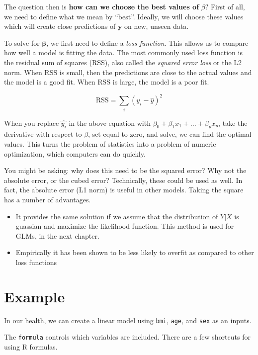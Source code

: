 \documentclass[openany]{book}
\providecommand{\tightlist}{%
  \setlength{\itemsep}{0pt}\setlength{\parskip}{0pt}}
\begin{document}
The question then is \textbf{how can we choose the best values of} \(\beta?\) First of all, we need to define what we mean by ``best''. Ideally, we will choose these values which will create close predictions of \(\mathbf{y}\) on new, unseen data.

To solve for \(\mathbf{\beta}\), we first need to define a \emph{loss function}. This allows us to compare how well a model is fitting the data. The most commonly used loss function is the residual sum of squares (RSS), also called the \emph{squared error loss} or the L2 norm. When RSS is small, then the predictions are close to the actual values and the model is a good fit. When RSS is large, the model is a poor fit.

\[
\text{RSS} = \sum_i(y_i - \hat{y})^2
\]

When you replace \(\hat{y_i}\) in the above equation with \(\beta_0 + \beta_1 x_1 + ... + \beta_p x_p\), take the derivative with respect to \(\beta\), set equal to zero, and solve, we can find the optimal values. This turns the problem of statistics into a problem of numeric optimization, which computers can do quickly.

You might be asking: why does this need to be the squared error? Why not the absolute error, or the cubed error? Technically, these could be used as well. In fact, the absolute error (L1 norm) is useful in other models. Taking the square has a number of advantages.

\begin{itemize}
\tightlist
\item
  It provides the same solution if we assume that the distribution of \(Y|X\) is guassian and maximize the likelihood function. This method is used for GLMs, in the next chapter.
\item
  Empirically it has been shown to be less likely to overfit as compared to other loss functions
\end{itemize}

\hypertarget{example}{%
\section{Example}\label{example}}

In our health, we can create a linear model using \texttt{bmi}, \texttt{age}, and \texttt{sex} as an inputs.

The \texttt{formula} controls which variables are included. There are a few shortcuts for using R formulas.
\end{document}
